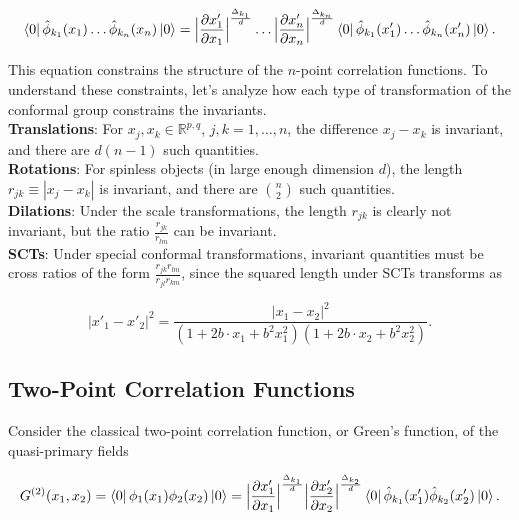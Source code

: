 \begin{equation}
\bra{0} \hat{\phi}_{k_1} (x_1) \dots \hat{\phi}_{k_n} (x_n) \ket{0} = \Big{|} \frac{\partial x_1'}{\partial x_1} \Big{|}^{\frac{\Delta_{k_1}}{d}} \dots \Big{|} \frac{\partial x_n'}{\partial x_n} \Big{|}^{\frac{\Delta_{k_n}}{d}} \bra{0} \hat{\phi}_{k_1} (x'_1) \dots \hat{\phi}_{k_n} (x'_n) \ket{0}.
\end{equation}

\noindent This equation constrains the structure of the $n$-point correlation functions. To understand these constraints, let's analyze how each type of transformation of the conformal group constrains the invariants. \\

\noindent \textbf{Translations}: For $x_j, x_k \in \mathbb{R}^{p,q}$, $j, k = 1, \dots, n$, the difference $x_j - x_k$ is invariant, and there are $d(n-1)$ such quantities. \\

\noindent \textbf{Rotations}: For spinless objects (in large enough dimension $d$), the length $r_{jk} \equiv |x_j - x_k |$ is invariant, and there are ${n \choose 2}$ such quantities. \\

\noindent \textbf{Dilations}: Under the scale transformations, the length $r_{jk}$ is clearly not invariant, but the ratio $\frac{r_{jk}}{r_{lm}}$ can be invariant. \\

\noindent \textbf{SCTs}: Under special conformal transformations, invariant quantities must be cross ratios of the form $\frac{r_{jk} r_{lm}}{r_{jl} r_{km}}$, since the squared length under SCTs transforms as

\begin{equation}
|x'_1 - x'_2 |^2 = \frac{|x_1 - x_2 |^2}{(1 + 2 b \cdot x_1 + b^2 x_1^2) (1 + 2 b \cdot x_2 + b^2 x_2^2)}.
\end{equation}

\subsection*{Two-Point Correlation Functions}

\noindent Consider the classical two-point correlation function, or Green's function, of the quasi-primary fields

\begin{equation}
G^{(2)} (x_1, x_2) = \bra{0} \phi_1 (x_1) \phi_2 (x_2) \ket{0} = \Big{|} \frac{\partial x_1'}{\partial x_1} \Big{|}^{\frac{\Delta_{k_1}}{d}} \Big{|} \frac{\partial x_2'}{\partial x_2} \Big{|}^{\frac{\Delta_{k_2}}{d}} \bra{0} \hat{\phi}_{k_1} (x'_1) \hat{\phi}_{k_2} (x'_2) \ket{0}.
\end{equation}


